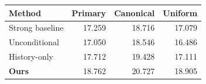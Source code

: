 \begin{tabular}{lrrr}
\toprule
Method & Primary & Canonical & Uniform \\
\midrule
Strong baseline & 17.259 & 18.716 & 17.079 \\
Unconditional & 17.050 & 18.546 & 16.486 \\
History-only & 17.712 & 19.428 & 17.111 \\
\textbf{Ours} & 18.762 & 20.727 & 18.905 \\
\bottomrule
\end{tabular}
